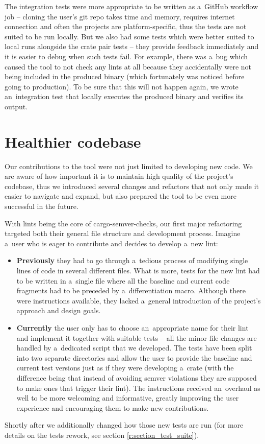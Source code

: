 \documentclass[licencjacka,en]{pracamgr}
\begin{document}
The integration tests were more appropriate to be written as a~GitHub workflow job
-- cloning the user's git repo takes time and memory, requires internet connection
and often the projects are platform-specific,
thus the tests are not suited to be run locally.
But we also had some tests which were better suited to local runs alongside the crate pair tests
-- they provide feedback immediately and it is easier to debug when such tests fail.
For example, there was a~bug which caused the tool to not check any lints at all
because they accidentally were not being included in the produced binary
(which fortunately was noticed before going to production).
To be sure that this will not happen again, we wrote an~integration test that
locally executes the produced binary and verifies its output.

\section{Healthier codebase}\label{r:section_healthier_codebase}

Our contributions to the tool were not just limited to developing new code. We are aware of
how important it is to maintain high quality of the project's codebase, thus we introduced
several changes and refactors that not only made it easier to navigate and expand, but also
prepared the tool to be even more successful in the future.

With lints being the core of cargo-semver-checks, our first major refactoring targeted both their
general file structure and development process. Imagine a~user who is eager to contribute
and decides to develop a~new lint:
\begin{itemize}
	\item \textbf{Previously} they had to go through a~tedious process of modifying single lines
	of code in several different files. What is more, tests for the new lint had to be written
	in a~single file where all the baseline and current code fragments had to be preceded by
	a~differentiation macro. Although there were instructions available, they lacked
	a~general introduction of the project's approach and design goals.

	\item \textbf{Currently} the user only has to choose an~appropriate name for their lint
	and implement it together with suitable tests -- all the minor file changes are handled
	by a~dedicated script that we developed. The tests have been split into two separate
	directories and allow the user to provide the baseline and current test versions just
	as if they were developing a~crate (with the difference being that instead of avoiding semver violations
	they are supposed to make ones that trigger their lint). The instructions received an~overhaul
	as well to be more welcoming and informative, greatly improving the user experience
	and encouraging them to make new contributions.
\end{itemize}
Shortly after we additionally changed how those new tests are run
(for more details on the tests rework, see section \ref{r:section_test_suite}).
\end{document}
